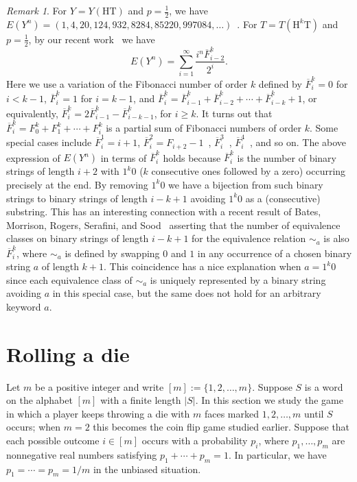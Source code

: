 \documentclass[10pt]{amsart}
\theoremstyle{definition}
\theoremstyle{remark}
\newtheorem{remark}[theorem]{Remark}
\newcommand{\HH}{\mathrm{H}} \newcommand{\TT}{\mathrm{T}}
\begin{document}
\begin{remark}
For $Y=Y(\HH\TT)$ and $p = \frac12$, we have $E(Y^n) = (1, 4, 20, 124, 932, 8284, 85220, 997084, \ldots)$~\cite[A162509]{OEIS}.
For $T=T(\HH^k\TT)$ and $p=\frac12$, by our recent work~\cite[Proposition~3.2]{Huang} we have 
\[
E(Y^n) = \sum_{i=1}^\infty \frac{i^n \overline F_{i-2}^k}{2^i}.
\]
Here we use a variation of the Fibonacci number of order $k$ defined by $\overline F_i^k = 0$ for $i<k-1$, $\overline F_i^k = 1$ for $i=k-1$, and $\overline F_i^k = \overline F_{i-1}^k + \overline F_{i-2}^k + \cdots + \overline F_{i-k}^k + 1$, or equivalently, $\overline F_i^k = 2\overline F_{i-1}^k -  \overline F_{i-k-1}^k$, for $i\ge k$.
It turns out that $\overline F_i^k = F_0^k + F_1^k + \cdots + F_i^k$ is a partial sum of Fibonacci numbers of order $k$.
Some special cases include $\overline F_i^1=i+1$, $\overline F_i^2 = F_{i+2}-1$~\cite[A000071]{OEIS}, $\overline F_i^3$~\cite[A008937]{OEIS}, $\overline F_i^4$~\cite[A107066]{OEIS}, and so on.
The above expression of $E(Y^n)$ in terms of $\overline F_i^k$ holds because $\overline F_i^k$ is the number of binary strings of length $i+2$ with $1^k 0$ ($k$ consecutive ones followed by a zero) occurring precisely at the end.
By removing $1^k0$ we have a bijection from such binary strings to binary strings of length $i-k+1$ avoiding $1^k0$ as a (consecutive) substring.
This has an interesting connection with a recent result of Bates, Morrison, Rogers, Serafini, and Sood~\cite{Bates} asserting that the number of equivalence classes on binary strings of length $i-k+1$ for the equivalence relation $\sim_a$ is also $\overline F_i^k$, where $\sim_a$ is defined by swapping $0$ and $1$ in any occurrence of a chosen binary string $a$ of length $k+1$.
This coincidence has a nice explanation when $a=1^k 0$ since each equivalence class of $\sim_a$ is uniquely represented by a binary string avoiding $a$ in this special case, but the same does not hold for an arbitrary keyword $a$.
\end{remark}



\section{Rolling a die}\label{sec:die}

Let $m$ be a positive integer and write $[m]:=\{1,2,\ldots,m\}$.
Suppose $S$ is a word on the alphabet $[m]$ with a finite length $|S|$.
In this section we study the game in which a player keeps throwing a die with $m$ faces marked $1,2,\ldots,m$ until $S$ occurs;
when $m=2$ this becomes the coin flip game studied earlier.
Suppose that each possible outcome $i\in[m]$ occurs with a probability $p_i$, where $p_1, \ldots, p_m$ are nonnegative real numbers satisfying $p_1+\cdots+p_m=1$.
In particular, we have $p_1=\cdots=p_m=1/m$ in the unbiased situation.
\end{document}
